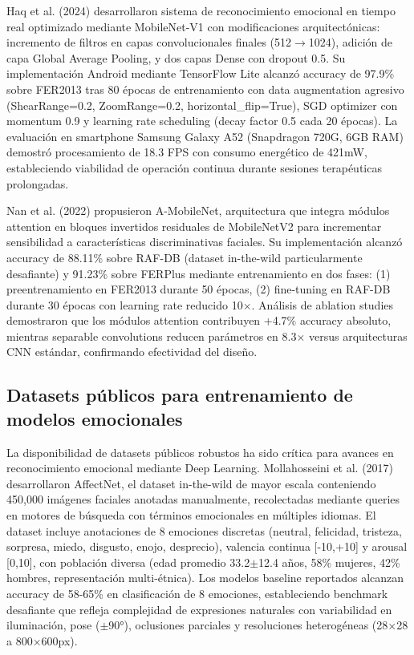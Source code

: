 \documentclass[journal,article,submit,pdftex,moreauthors]{Definitions/mdpi}
\begin{document}
	Haq et al. (2024) \cite{ref5} desarrollaron sistema de reconocimiento emocional en tiempo real optimizado mediante MobileNet-V1 con modificaciones arquitectónicas: incremento de filtros en capas convolucionales finales (512$\rightarrow$1024), adición de capa Global Average Pooling, y dos capas Dense con dropout 0.5. Su implementación Android mediante TensorFlow Lite alcanzó accuracy de 97.9\% sobre FER2013 tras 80 épocas de entrenamiento con data augmentation agresivo (ShearRange=0.2, ZoomRange=0.2, horizontal\_flip=True), SGD optimizer con momentum 0.9 y learning rate scheduling (decay factor 0.5 cada 20 épocas). La evaluación en smartphone Samsung Galaxy A52 (Snapdragon 720G, 6GB RAM) demostró procesamiento de 18.3 FPS con consumo energético de 421mW, estableciendo viabilidad de operación continua durante sesiones terapéuticas prolongadas.
	
	Nan et al. (2022) \cite{ref4} propusieron A-MobileNet, arquitectura que integra módulos attention en bloques invertidos residuales de MobileNetV2 para incrementar sensibilidad a características discriminativas faciales. Su implementación alcanzó accuracy de 88.11\% sobre RAF-DB (dataset in-the-wild particularmente desafiante) y 91.23\% sobre FERPlus mediante entrenamiento en dos fases: (1) preentrenamiento en FER2013 durante 50 épocas, (2) fine-tuning en RAF-DB durante 30 épocas con learning rate reducido 10$\times$. Análisis de ablation studies demostraron que los módulos attention contribuyen +4.7\% accuracy absoluto, mientras separable convolutions reducen parámetros en 8.3$\times$ versus arquitecturas CNN estándar, confirmando efectividad del diseño.
	
	\subsection{Datasets públicos para entrenamiento de modelos emocionales}
	
	La disponibilidad de datasets públicos robustos ha sido crítica para avances en reconocimiento emocional mediante Deep Learning. Mollahosseini et al. (2017) \cite{ref13} desarrollaron AffectNet, el dataset in-the-wild de mayor escala conteniendo 450,000 imágenes faciales anotadas manualmente, recolectadas mediante queries en motores de búsqueda con términos emocionales en múltiples idiomas. El dataset incluye anotaciones de 8 emociones discretas (neutral, felicidad, tristeza, sorpresa, miedo, disgusto, enojo, desprecio), valencia continua [-10,+10] y arousal [0,10], con población diversa (edad promedio 33.2$\pm$12.4 años, 58\% mujeres, 42\% hombres, representación multi-étnica). Los modelos baseline reportados alcanzan accuracy de 58-65\% en clasificación de 8 emociones, estableciendo benchmark desafiante que refleja complejidad de expresiones naturales con variabilidad en iluminación, pose ($\pm$90°), oclusiones parciales y resoluciones heterogéneas (28$\times$28 a 800$\times$600px).
	
\end{document}
